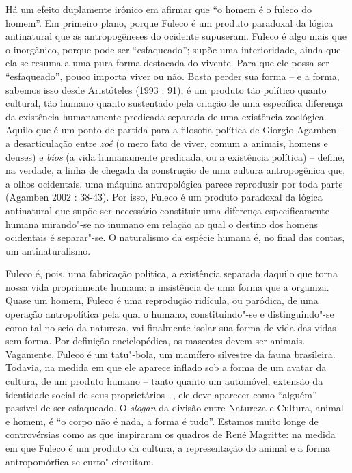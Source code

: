 Há um efeito duplamente irônico em afirmar que ``o homem é o fuleco do
homem''. Em primeiro plano, porque Fuleco é um produto paradoxal da
lógica antinatural que as antropogêneses do ocidente supuseram. Fuleco é
algo mais que o inorgânico, porque pode ser ``esfaqueado''; supõe uma
interioridade, ainda que ela se resuma a uma pura forma destacada do
vivente. Para que ele possa ser ``esfaqueado'', pouco importa viver ou
não. Basta perder sua forma -- e a forma, sabemos isso desde Aristóteles
(1993 : 91), é um produto tão político quanto cultural, tão humano
quanto sustentado pela criação de uma específica diferença da existência
humanamente predicada separada de uma existência zoológica. Aquilo que é
um ponto de partida para a filosofia política de Giorgio Agamben -- a
desarticulação entre \emph{zoé }(o mero fato de viver, comum a animais,
homens e deuses) e \emph{bíos} (a vida humanamente predicada, ou a
existência política) -- define, na verdade, a linha de chegada da
construção de uma cultura antropogênica que, a olhos ocidentais, uma
máquina antropológica parece reproduzir por toda parte (Agamben 2002 :
38-43). Por isso, Fuleco é um produto paradoxal da lógica antinatural
que supõe ser necessário constituir uma diferença especificamente humana
mirando"-se no inumano em relação ao qual o destino dos homens ocidentais
é separar"-se. O naturalismo da espécie humana é, no final das contas, um
antinaturalismo.

Fuleco é, pois, uma fabricação política, a existência separada daquilo
que torna nossa vida propriamente humana: a insistência de uma forma que
a organiza. Quase um homem, Fuleco é uma reprodução ridícula, ou
paródica, de uma operação antropolítica pela qual o humano,
constituindo"-se e distinguindo"-se como tal no seio da natureza, vai
finalmente isolar sua forma de vida das vidas sem forma. Por definição
enciclopédica, os mascotes devem ser animais. Vagamente, Fuleco é um
tatu"-bola, um mamífero silvestre da fauna brasileira. Todavia, na medida
em que ele aparece inflado sob a forma de um avatar da cultura, de um
produto humano -- tanto quanto um automóvel, extensão da identidade
social de seus proprietários --, ele deve aparecer como ``alguém''
passível de ser esfaqueado. O \emph{slogan} da divisão entre Natureza e
Cultura, animal e homem, é ``o corpo não é nada, a forma é tudo''.
Estamos muito longe de controvérsias como as que inspiraram os quadros
de René Magritte: na medida em que Fuleco é um produto da
cultura, a representação do animal e a forma antropomórfica se
curto"-circuitam.


